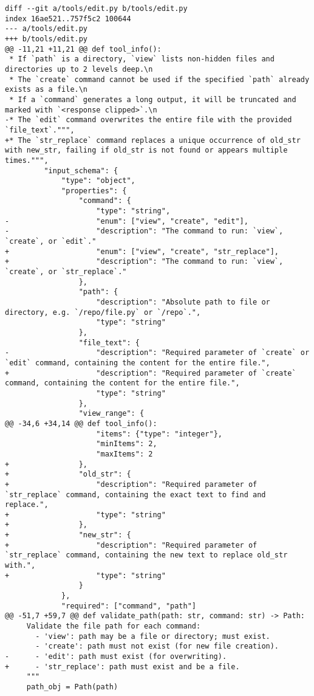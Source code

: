 \begin{lstlisting}[style=diffstyle]
diff --git a/tools/edit.py b/tools/edit.py
index 16ae521..757f5c2 100644
--- a/tools/edit.py
+++ b/tools/edit.py
@@ -11,21 +11,21 @@ def tool_info():
 * If `path` is a directory, `view` lists non-hidden files and directories up to 2 levels deep.\n
 * The `create` command cannot be used if the specified `path` already exists as a file.\n
 * If a `command` generates a long output, it will be truncated and marked with `<response clipped>`.\n
-* The `edit` command overwrites the entire file with the provided `file_text`.""",
+* The `str_replace` command replaces a unique occurrence of old_str with new_str, failing if old_str is not found or appears multiple times.""",
         "input_schema": {
             "type": "object",
             "properties": {
                 "command": {
                     "type": "string",
-                    "enum": ["view", "create", "edit"],
-                    "description": "The command to run: `view`, `create`, or `edit`."
+                    "enum": ["view", "create", "str_replace"],
+                    "description": "The command to run: `view`, `create`, or `str_replace`."
                 },
                 "path": {
                     "description": "Absolute path to file or directory, e.g. `/repo/file.py` or `/repo`.",
                     "type": "string"
                 },
                 "file_text": {
-                    "description": "Required parameter of `create` or `edit` command, containing the content for the entire file.",
+                    "description": "Required parameter of `create` command, containing the content for the entire file.",
                     "type": "string"
                 },
                 "view_range": {
@@ -34,6 +34,14 @@ def tool_info():
                     "items": {"type": "integer"},
                     "minItems": 2,
                     "maxItems": 2
+                },
+                "old_str": {
+                    "description": "Required parameter of `str_replace` command, containing the exact text to find and replace.",
+                    "type": "string"
+                },
+                "new_str": {
+                    "description": "Required parameter of `str_replace` command, containing the new text to replace old_str with.",
+                    "type": "string"
                 }
             },
             "required": ["command", "path"]
@@ -51,7 +59,7 @@ def validate_path(path: str, command: str) -> Path:
     Validate the file path for each command:
       - 'view': path may be a file or directory; must exist.
       - 'create': path must not exist (for new file creation).
-      - 'edit': path must exist (for overwriting).
+      - 'str_replace': path must exist and be a file.
     """
     path_obj = Path(path)
 

\end{lstlisting}
